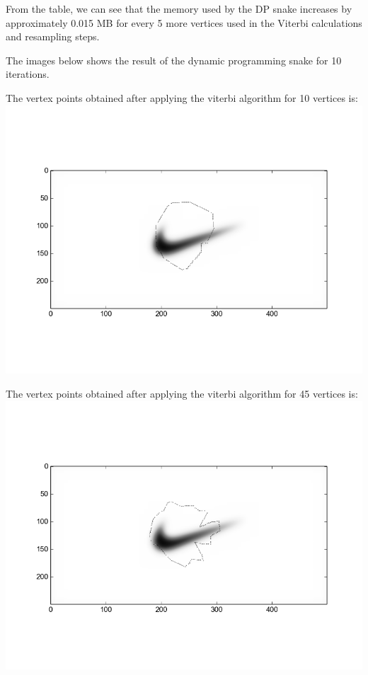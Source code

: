 \documentclass[twoside]{article}
\begin{document}
\begin{multicols}{2}
From the table, we can see that the memory used by the DP snake increases by approximately 0.015 MB for every 5 more vertices used in the Viterbi calculations and resampling steps.

The images below shows the result of the dynamic programming snake for 10 iterations.

The vertex points obtained after applying the viterbi algorithm for 10 vertices is:
\FloatBarrier
\includegraphics[scale=0.3]{./report_images/viterbi_10vertices.png}
\FloatBarrier

The vertex points obtained after applying the viterbi algorithm for 45 vertices is:
\FloatBarrier
\includegraphics[scale=0.3]{./report_images/viterbi_45vertices.png}
\FloatBarrier


\end{multicols}
\end{document}
